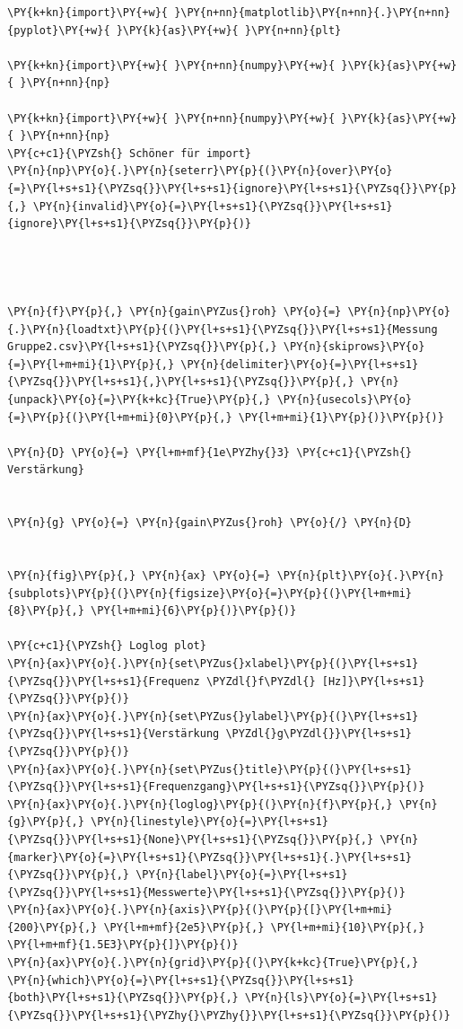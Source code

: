     \begin{tcolorbox}[breakable, size=fbox, boxrule=1pt, pad at break*=1mm,colback=cellbackground, colframe=cellborder]
\begin{Verbatim}[commandchars=\\\{\}]
\PY{k+kn}{import}\PY{+w}{ }\PY{n+nn}{matplotlib}\PY{n+nn}{.}\PY{n+nn}{pyplot}\PY{+w}{ }\PY{k}{as}\PY{+w}{ }\PY{n+nn}{plt}

\PY{k+kn}{import}\PY{+w}{ }\PY{n+nn}{numpy}\PY{+w}{ }\PY{k}{as}\PY{+w}{ }\PY{n+nn}{np}

\PY{k+kn}{import}\PY{+w}{ }\PY{n+nn}{numpy}\PY{+w}{ }\PY{k}{as}\PY{+w}{ }\PY{n+nn}{np}
\PY{c+c1}{\PYZsh{} Schöner für import}
\PY{n}{np}\PY{o}{.}\PY{n}{seterr}\PY{p}{(}\PY{n}{over}\PY{o}{=}\PY{l+s+s1}{\PYZsq{}}\PY{l+s+s1}{ignore}\PY{l+s+s1}{\PYZsq{}}\PY{p}{,} \PY{n}{invalid}\PY{o}{=}\PY{l+s+s1}{\PYZsq{}}\PY{l+s+s1}{ignore}\PY{l+s+s1}{\PYZsq{}}\PY{p}{)}




\PY{n}{f}\PY{p}{,} \PY{n}{gain\PYZus{}roh} \PY{o}{=} \PY{n}{np}\PY{o}{.}\PY{n}{loadtxt}\PY{p}{(}\PY{l+s+s1}{\PYZsq{}}\PY{l+s+s1}{Messung Gruppe2.csv}\PY{l+s+s1}{\PYZsq{}}\PY{p}{,} \PY{n}{skiprows}\PY{o}{=}\PY{l+m+mi}{1}\PY{p}{,} \PY{n}{delimiter}\PY{o}{=}\PY{l+s+s1}{\PYZsq{}}\PY{l+s+s1}{,}\PY{l+s+s1}{\PYZsq{}}\PY{p}{,} \PY{n}{unpack}\PY{o}{=}\PY{k+kc}{True}\PY{p}{,} \PY{n}{usecols}\PY{o}{=}\PY{p}{(}\PY{l+m+mi}{0}\PY{p}{,} \PY{l+m+mi}{1}\PY{p}{)}\PY{p}{)}

\PY{n}{D} \PY{o}{=} \PY{l+m+mf}{1e\PYZhy{}3} \PY{c+c1}{\PYZsh{} Verstärkung}


\PY{n}{g} \PY{o}{=} \PY{n}{gain\PYZus{}roh} \PY{o}{/} \PY{n}{D}


\PY{n}{fig}\PY{p}{,} \PY{n}{ax} \PY{o}{=} \PY{n}{plt}\PY{o}{.}\PY{n}{subplots}\PY{p}{(}\PY{n}{figsize}\PY{o}{=}\PY{p}{(}\PY{l+m+mi}{8}\PY{p}{,} \PY{l+m+mi}{6}\PY{p}{)}\PY{p}{)}

\PY{c+c1}{\PYZsh{} Loglog plot}
\PY{n}{ax}\PY{o}{.}\PY{n}{set\PYZus{}xlabel}\PY{p}{(}\PY{l+s+s1}{\PYZsq{}}\PY{l+s+s1}{Frequenz \PYZdl{}f\PYZdl{} [Hz]}\PY{l+s+s1}{\PYZsq{}}\PY{p}{)}
\PY{n}{ax}\PY{o}{.}\PY{n}{set\PYZus{}ylabel}\PY{p}{(}\PY{l+s+s1}{\PYZsq{}}\PY{l+s+s1}{Verstärkung \PYZdl{}g\PYZdl{}}\PY{l+s+s1}{\PYZsq{}}\PY{p}{)}
\PY{n}{ax}\PY{o}{.}\PY{n}{set\PYZus{}title}\PY{p}{(}\PY{l+s+s1}{\PYZsq{}}\PY{l+s+s1}{Frequenzgang}\PY{l+s+s1}{\PYZsq{}}\PY{p}{)}
\PY{n}{ax}\PY{o}{.}\PY{n}{loglog}\PY{p}{(}\PY{n}{f}\PY{p}{,} \PY{n}{g}\PY{p}{,} \PY{n}{linestyle}\PY{o}{=}\PY{l+s+s1}{\PYZsq{}}\PY{l+s+s1}{None}\PY{l+s+s1}{\PYZsq{}}\PY{p}{,} \PY{n}{marker}\PY{o}{=}\PY{l+s+s1}{\PYZsq{}}\PY{l+s+s1}{.}\PY{l+s+s1}{\PYZsq{}}\PY{p}{,} \PY{n}{label}\PY{o}{=}\PY{l+s+s1}{\PYZsq{}}\PY{l+s+s1}{Messwerte}\PY{l+s+s1}{\PYZsq{}}\PY{p}{)}
\PY{n}{ax}\PY{o}{.}\PY{n}{axis}\PY{p}{(}\PY{p}{[}\PY{l+m+mi}{200}\PY{p}{,} \PY{l+m+mf}{2e5}\PY{p}{,} \PY{l+m+mi}{10}\PY{p}{,} \PY{l+m+mf}{1.5E3}\PY{p}{]}\PY{p}{)}
\PY{n}{ax}\PY{o}{.}\PY{n}{grid}\PY{p}{(}\PY{k+kc}{True}\PY{p}{,} \PY{n}{which}\PY{o}{=}\PY{l+s+s1}{\PYZsq{}}\PY{l+s+s1}{both}\PY{l+s+s1}{\PYZsq{}}\PY{p}{,} \PY{n}{ls}\PY{o}{=}\PY{l+s+s1}{\PYZsq{}}\PY{l+s+s1}{\PYZhy{}\PYZhy{}}\PY{l+s+s1}{\PYZsq{}}\PY{p}{)}
\end{Verbatim}
\end{tcolorbox}


